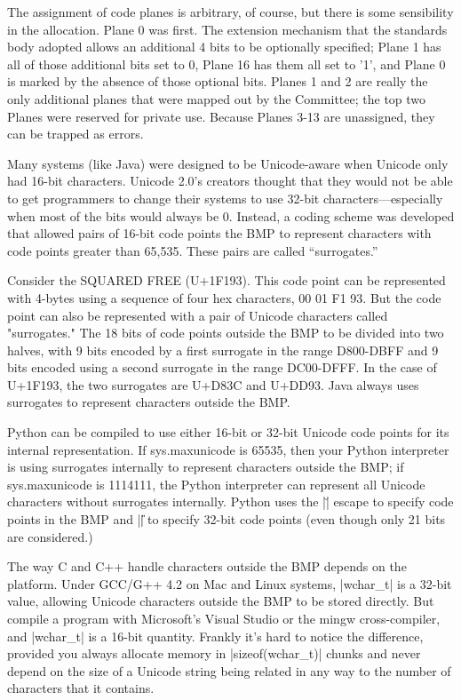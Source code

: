 The assignment of code planes is arbitrary, of course, but there is some sensibility in the allocation. Plane 0 was first. The extension mechanism that the standards body adopted allows an additional 4 bits to be optionally specified; Plane 1 has all of those additional bits set to 0, Plane 16 has them all set to '1', and Plane 0 is marked by the absence of those optional bits. Planes 1 and 2 are really the only additional planes that were mapped out by the Committee; the top two Planes were reserved for private use. Because Planes 3-13 are unassigned, they can be trapped as errors. 

Many systems (like Java) were designed to be Unicode-aware when
Unicode only had 16-bit characters.  Unicode 2.0's creators thought
that they would not be able to get programmers to change their systems
to use 32-bit characters---especially when most of the bits would
always be 0. Instead, a coding scheme was developed that allowed pairs
of 16-bit code points the BMP to represent characters with code points
greater than 65,535. These pairs are called ``surrogates.''

Consider the SQUARED FREE (U+1F193). This code point can be represented with 4-bytes using a sequence of four hex characters, 00 01 F1 93. But the code point can also be represented with a pair of Unicode characters called "surrogates." The 18 bits of code points outside the BMP to be divided into two halves, with 9 bits encoded by a first surrogate in the range D800-DBFF and 9 bits encoded using a second surrogate in the range DC00-DFFF. In the case of U+1F193, the two surrogates are U+D83C and U+DD93. Java always uses surrogates to represent characters outside the BMP.

Python can be compiled to use either 16-bit or 32-bit Unicode code
points for its internal representation. If sys.maxunicode is 65535,
then your Python interpreter is using surrogates internally to
represent characters outside the BMP; if sys.maxunicode is 1114111,
the Python interpreter can represent all Unicode characters without
surrogates internally. Python uses the |\u| escape to specify code
points in the BMP and |\U| to specify 32-bit code points (even though
only 21 bits are considered.)

The way C and C++ handle characters outside the BMP depends on the
platform.  Under GCC/G++ 4.2 on Mac and Linux systems, |wchar_t| is a
32-bit value, allowing Unicode characters outside the BMP to be stored
directly. But compile a program with Microsoft's Visual Studio or the
mingw cross-compiler, and |wchar_t| is a 16-bit quantity. Frankly it's
hard to notice the difference, provided you always allocate memory in
|sizeof(wchar_t)| chunks and never depend on the size of a Unicode
string being related in any way to the number of characters that it
contains.  

